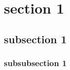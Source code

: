 \section{section 1} \label{sec1}

\subsection{subsection 1} \label{sec1:1}

\subsubsection{subsubsection 1} \label{sec1:1:1}

\blindtext[1]
